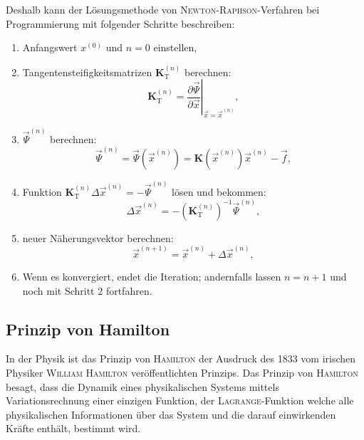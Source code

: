 	 Deshalb kann der Lösungsmethode von \textsc{Newton}-\textsc{Raphson}-Verfahren bei Programmierung mit folgender Schritte beschreiben:
	 \begin{enumerate}
	 	\item Anfangswert $ x^{(0)} $ und $ n=0 $ einstellen,
	 	\item Tangentensteifigkeitsmatrizen $ \mathbf{K}_{\text{T}}^{(n)} $ berechnen:
	 	\begin{equation}\label{equ:Tangentensteifigkeitsmatrizen}
	 	\mathbf{K}_{\text{T}}^{(n)} = \left. \dfrac{\partial \vec{\varPsi}}{\partial \vec{x}}\right| _{\vec{x}=\vec{x}^{(n)}} ,
	 	\end{equation}
	 	\item $ \vec{\varPsi}^{(n)} $ berechnen:
	 	\begin{equation}\label{equ:Psi-Berechnen}
	 	\vec{\varPsi}^{(n)} = \vec{\varPsi}(\vec{x}^{(n)}) = \mathbf{K}(\vec{x}^{(n)}) \vec{x}^{(n)}-\vec{f},
	 	\end{equation}
	 	\item Funktion $ \mathbf{K}_{\text{T}}^{(n)} \Delta \vec{x}^{(n)} = -\vec{\varPsi}^{(n)} $ lösen und bekommen:
	 	\begin{equation}\label{equ:Delta-X}
	 	\Delta\vec{x}^{(n)} = - (\mathbf{K}_{\text{T}}^{(n)})^{-1} \vec{\varPsi}^{(n)},
	 	\end{equation}
	 	\item neuer Näherungsvektor berechnen:
	 	\begin{equation}\label{equ:Naeherungswert-(n+1)}
	 	\vec{x}^{(n+1)} = \vec{x}^{(n)} + \Delta\vec{x}^{(n)},
	 	\end{equation}
	 	\item Wenn es konvergiert, endet die Iteration; andernfalls lassen $ n=n+1 $ und noch mit Schritt 2 fortfahren.
	 \end{enumerate}
	 
	 \subsection{Prinzip von Hamilton} \label{sec:prinzip-hamilton}
	 In der Physik ist das Prinzip von \textsc{Hamilton} der Ausdruck des 1833 vom irischen Physiker \textsc{William Hamilton} veröffentlichten Prinzips. Das Prinzip von \textsc{Hamilton} besagt, dass die Dynamik eines physikalischen Systems mittels Variationsrechnung einer einzigen Funktion, der \textsc{Lagrange}-Funktion welche alle physikalischen Informationen über das System und die darauf einwirkenden Kräfte enthält, bestimmt wird. \\
	 
